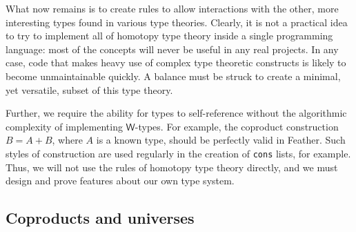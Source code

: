 \documentclass[11pt]{book}
\begin{document}
What now remains is to create rules to allow interactions with the other, more interesting types found in various type theories.
Clearly, it is not a practical idea to try to implement all of homotopy type theory inside a single programming language: most of the concepts will never be useful in any real projects.
In any case, code that makes heavy use of complex type theoretic constructs is likely to become unmaintainable quickly.
A balance must be struck to create a minimal, yet versatile, subset of this type theory.

Further, we require the ability for types to self-reference without the algorithmic complexity of implementing \( \mathsf{W} \)-types.
For example, the coproduct construction \( B = A + B \), where \( A \) is a known type, should be perfectly valid in Feather.
Such styles of construction are used regularly in the creation of \lstinline{cons} lists, for example.
Thus, we will not use the rules of homotopy type theory directly, and we must design and prove features about our own type system.


\subsection{Coproducts and universes}
\end{document}
